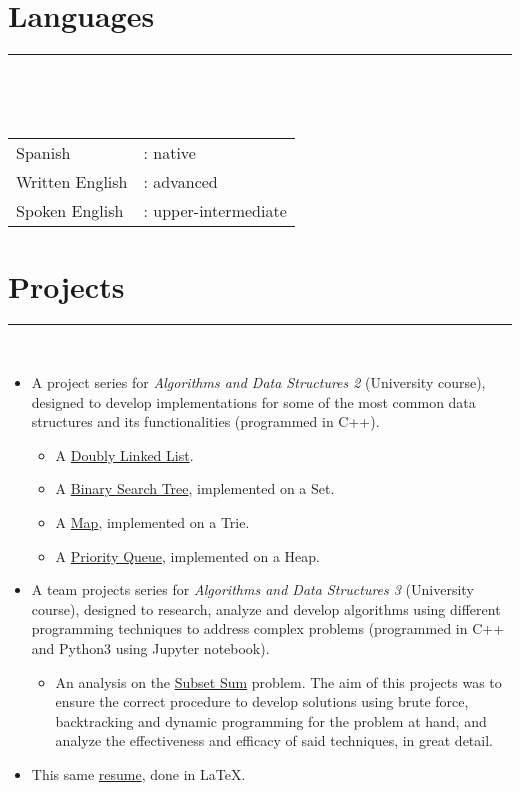 \documentclass{article}
\begin{document}
\section*{Languages}
\hrule
\

\

\begin{tabular}{l l}
    Spanish & : native \\
    Written English & : advanced \\
    Spoken English & : upper-intermediate
\end{tabular}

\section*{Projects}
\hrule
\

\begin{itemize}
    \item A project series for \textit{Algorithms and Data Structures 2} (University course), designed to develop implementations for some of the most common data structures and its functionalities (programmed in C++).
    \begin{itemize}
        \item A \href{https://github.com/lucasDS-0/Doubly_Linked_List}{Doubly Linked List}.
        \item A \href{https://github.com/lucasDS-0/BST_on_a_set}{Binary Search Tree}, implemented on a Set.
        \item A \href{https://github.com/lucasDS-0/Map_on_a_trie}{Map}, implemented on a Trie.
        \item A \href{https://github.com/lucasDS-0/Priority_queue_on_a_heap}{Priority Queue}, implemented on a Heap.
    \end{itemize}
    \item A team projects series for \textit{Algorithms and Data Structures 3} (University course), designed to research, analyze and develop algorithms using different programming techniques to address complex problems (programmed in C++ and Python3 using Jupyter notebook).
    \begin{itemize}
        \item An analysis on the \href{https://github.com/lucasDS-0/Subset_sum}{Subset Sum} problem. The aim of this projects was to ensure the correct procedure to develop solutions using brute force, backtracking and dynamic programming for the problem at hand, and analyze the effectiveness and efficacy of said techniques, in great detail.
    \end{itemize}
    \item This same \href{https://github.com/lucasDS-0/Resume}{resume}, done in \LaTeX.
\end{itemize}
\end{document}
